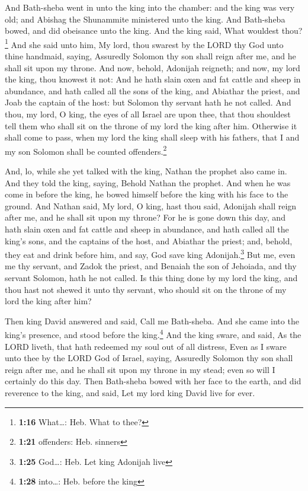 And Bath-sheba went in unto the king into the chamber:
and the king was very old; and Abishag the Shunammite ministered unto
the king.  And Bath-sheba bowed, and did obeisance unto
the king. And the king said, What wouldest thou?\footnote{\textbf{1:16}
  What\ldots: Heb. What to thee?}  And she said unto him,
My lord, thou swarest by the LORD thy God unto thine handmaid, saying,
Assuredly Solomon thy son shall reign after me, and he shall sit upon my
throne.  And now, behold, Adonijah reigneth; and now, my
lord the king, thou knowest it not:  And he hath slain
oxen and fat cattle and sheep in abundance, and hath called all the sons
of the king, and Abiathar the priest, and Joab the captain of the host:
but Solomon thy servant hath he not called.  And thou, my
lord, O king, the eyes of all Israel are upon thee, that thou shouldest
tell them who shall sit on the throne of my lord the king after him.
 Otherwise it shall come to pass, when my lord the king
shall sleep with his fathers, that I and my son Solomon shall be counted
offenders.\footnote{\textbf{1:21} offenders: Heb. sinners}

 And, lo, while she yet talked with the king, Nathan the
prophet also came in.  And they told the king, saying,
Behold Nathan the prophet. And when he was come in before the king, he
bowed himself before the king with his face to the ground.
 And Nathan said, My lord, O king, hast thou said,
Adonijah shall reign after me, and he shall sit upon my throne?
 For he is gone down this day, and hath slain oxen and
fat cattle and sheep in abundance, and hath called all the king's sons,
and the captains of the host, and Abiathar the priest; and, behold, they
eat and drink before him, and say, God save king Adonijah.\footnote{\textbf{1:25}
  God\ldots: Heb. Let king Adonijah live}  But me, even
me thy servant, and Zadok the priest, and Benaiah the son of Jehoiada,
and thy servant Solomon, hath he not called.  Is this
thing done by my lord the king, and thou hast not shewed it unto thy
servant, who should sit on the throne of my lord the king after him?

 Then king David answered and said, Call me Bath-sheba.
And she came into the king's presence, and stood before the
king.\footnote{\textbf{1:28} into\ldots: Heb. before the king}
 And the king sware, and said, As the LORD liveth, that
hath redeemed my soul out of all distress,  Even as I
sware unto thee by the LORD God of Israel, saying, Assuredly Solomon thy
son shall reign after me, and he shall sit upon my throne in my stead;
even so will I certainly do this day.  Then Bath-sheba
bowed with her face to the earth, and did reverence to the king, and
said, Let my lord king David live for ever.

